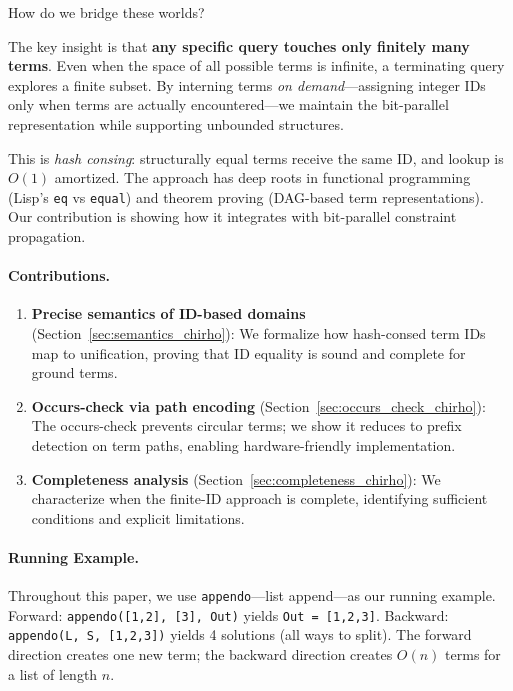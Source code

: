 \documentclass[11pt,a4paper]{article}
\begin{document}
How do we bridge these worlds?

The key insight is that \textbf{any specific query touches only finitely many terms}.
Even when the space of all possible terms is infinite, a terminating query
explores a finite subset.
By interning terms \emph{on demand}---assigning integer IDs only when terms are
actually encountered---we maintain the bit-parallel representation while
supporting unbounded structures.

This is \emph{hash consing}: structurally equal terms receive the same ID,
and lookup is $O(1)$ amortized.
The approach has deep roots in functional programming (Lisp's \texttt{eq} vs
\texttt{equal}) and theorem proving (DAG-based term representations).
Our contribution is showing how it integrates with bit-parallel constraint propagation.

\paragraph{Contributions.}
\begin{enumerate}
  \item \textbf{Precise semantics of ID-based domains} (Section~\ref{sec:semantics_chirho}):
        We formalize how hash-consed term IDs map to unification, proving that
        ID equality is sound and complete for ground terms.

  \item \textbf{Occurs-check via path encoding} (Section~\ref{sec:occurs_check_chirho}):
        The occurs-check prevents circular terms; we show it reduces to
        prefix detection on term paths, enabling hardware-friendly implementation.

  \item \textbf{Completeness analysis} (Section~\ref{sec:completeness_chirho}):
        We characterize when the finite-ID approach is complete, identifying
        sufficient conditions and explicit limitations.
\end{enumerate}

\paragraph{Running Example.}
Throughout this paper, we use \texttt{appendo}---list append---as our running example.
Forward: \texttt{appendo([1,2], [3], Out)} yields \texttt{Out = [1,2,3]}.
Backward: \texttt{appendo(L, S, [1,2,3])} yields 4 solutions (all ways to split).
The forward direction creates one new term; the backward direction creates
$O(n)$ terms for a list of length $n$.
\end{document}

